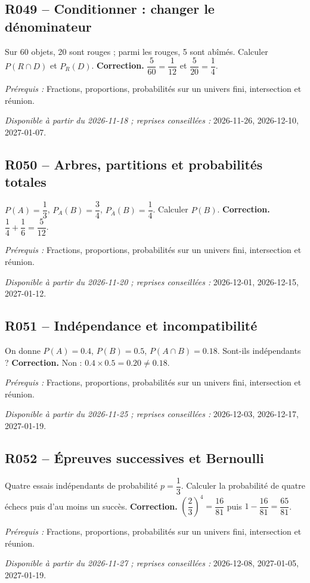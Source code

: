 \subsection*{R049 -- Conditionner : changer le dénominateur}\label{R049}
Sur 60 objets, 20 sont rouges ; parmi les rouges, 5 sont abîmés. Calculer $P(R\cap D)$ et $P_R(D)$.
\ifmxteacher\textbf{Correction.} $\dfrac{5}{60}=\dfrac{1}{12}$ et $\dfrac{5}{20}=\dfrac{1}{4}$.\par\textit{Prérequis :} Fractions, proportions, probabilités sur un univers fini, intersection et réunion.\par\textit{Disponible à partir du 2026-11-18 ; reprises conseillées :} 2026-11-26, 2026-12-10, 2027-01-07.\fi
{}\subsection*{R050 -- Arbres, partitions et probabilités totales}\label{R050}
$P(A)=\dfrac{1}{3}$, $P_A(B)=\dfrac{3}{4}$, $P_{\overline A}(B)=\dfrac{1}{4}$. Calculer $P(B)$.
\ifmxteacher\textbf{Correction.} $\dfrac{1}{4}+\dfrac{1}{6}=\dfrac{5}{12}$.\par\textit{Prérequis :} Fractions, proportions, probabilités sur un univers fini, intersection et réunion.\par\textit{Disponible à partir du 2026-11-20 ; reprises conseillées :} 2026-12-01, 2026-12-15, 2027-01-12.\fi
{}\subsection*{R051 -- Indépendance et incompatibilité}\label{R051}
On donne $P(A)=\num{0,4}$, $P(B)=\num{0,5}$, $P(A\cap B)=\num{0,18}$. Sont-ils indépendants ?
\ifmxteacher\textbf{Correction.} Non : $\num{0,4}\times\num{0,5}=\num{0,20}\ne\num{0,18}$.\par\textit{Prérequis :} Fractions, proportions, probabilités sur un univers fini, intersection et réunion.\par\textit{Disponible à partir du 2026-11-25 ; reprises conseillées :} 2026-12-03, 2026-12-17, 2027-01-19.\fi
{}\subsection*{R052 -- Épreuves successives et Bernoulli}\label{R052}
Quatre essais indépendants de probabilité $p=\dfrac{1}{3}$. Calculer la probabilité de quatre échecs puis d’au moins un succès.
\ifmxteacher\textbf{Correction.} $(\dfrac{2}{3})^4=\dfrac{16}{81}$ puis $1-\dfrac{16}{81}=\dfrac{65}{81}$.\par\textit{Prérequis :} Fractions, proportions, probabilités sur un univers fini, intersection et réunion.\par\textit{Disponible à partir du 2026-11-27 ; reprises conseillées :} 2026-12-08, 2027-01-05, 2027-01-19.\fi
